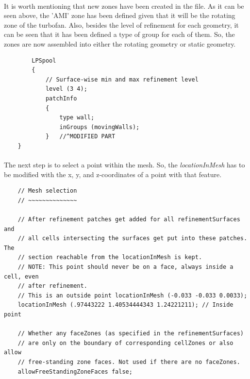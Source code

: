 \paragraph{}It is worth mentioning that new zones have been created in the file. As it can be seen above, the 'AMI' zone has been defined given that it will be the rotating zone of the turbofan. Also, besides the level of refinement for each geometry, it can be seen that it has been defined a type of group for each of them. So, the zones are now assembled into either the rotating geometry or static geometry.

\begin{footnotesize}
\begin{verbatim}
        LPSpool
        {
            // Surface-wise min and max refinement level
            level (3 4);
            patchInfo
            {
                type wall;
                inGroups (movingWalls);
            }   //^MODIFIED PART
	}
\end{verbatim}
\end{footnotesize}


\paragraph{}The next step is to select a point within the mesh. So, the \textit{locationInMesh} has to be modified with the x, y, and z-coordinates of a point with that feature.

\begin{footnotesize}
\begin{verbatim}
    // Mesh selection
    // ~~~~~~~~~~~~~~

    // After refinement patches get added for all refinementSurfaces and
    // all cells intersecting the surfaces get put into these patches. The
    // section reachable from the locationInMesh is kept.
    // NOTE: This point should never be on a face, always inside a cell, even
    // after refinement.
    // This is an outside point locationInMesh (-0.033 -0.033 0.0033);
    locationInMesh (.97443222 1.40534444343 1.24221211); // Inside point

    // Whether any faceZones (as specified in the refinementSurfaces)
    // are only on the boundary of corresponding cellZones or also allow
    // free-standing zone faces. Not used if there are no faceZones.
    allowFreeStandingZoneFaces false;
\end{verbatim}
\end{footnotesize}

